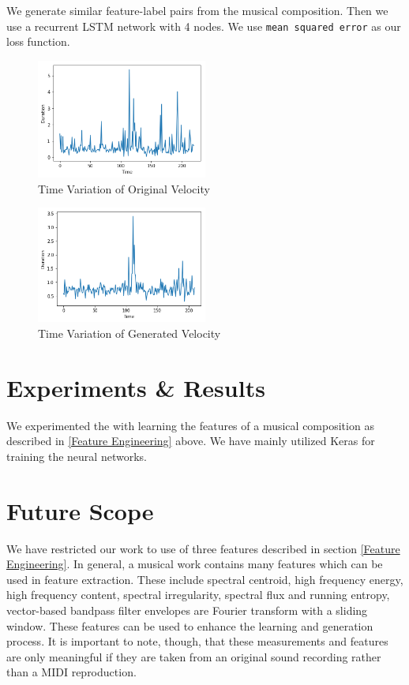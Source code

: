 \documentclass[conference]{IEEEtran}
\begin{document}
We generate similar feature-label pairs from the musical composition. Then we use a recurrent LSTM network with 4 nodes. We use \texttt{mean squared error} as our loss function.
\begin{figure}[h]
\includegraphics[width=0.5\textwidth]{IEEEtran/rest_o.png}
\caption{Time Variation of Original Velocity}
\label{fig:figure5}
\end{figure}

\begin{figure}[h]
\includegraphics[width=0.5\textwidth]{IEEEtran/rest_g.png}
\caption{Time Variation of Generated Velocity}
\label{fig:figure6}
\end{figure}

\section{Experiments \& Results}
We experimented the with learning the features of a musical composition as described in \ref{Feature Engineering} above. We have mainly utilized Keras \cite{keras} for training the neural networks.

\section{Future Scope}
We have restricted our work to use of three features described in section \ref{Feature Engineering}. In general, a musical work contains many features which can be used in feature extraction. These include spectral centroid, high frequency energy, high frequency content, spectral irregularity, spectral flux and running entropy, vector-based bandpass filter envelopes are Fourier transform with a sliding window.\cite{Jensen} These features can be used to enhance the learning and generation process. It is important to note, though, that these measurements and features are only meaningful if they are taken from an original sound recording rather than a MIDI reproduction.\\
\end{document}
